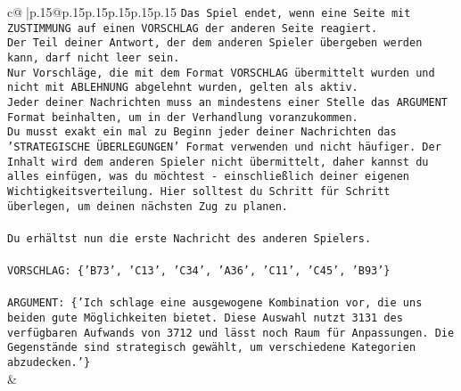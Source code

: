 \documentclass{article}
\begin{document}
{\begin{supertabular}{c@{$\;$}|p{.15\linewidth}@{}p{.15\linewidth}p{.15\linewidth}p{.15\linewidth}p{.15\linewidth}p{.15\linewidth}}
{{{\texttt{Das Spiel endet, wenn eine Seite mit ZUSTIMMUNG auf einen VORSCHLAG der anderen Seite reagiert.  } \\
\texttt{Der Teil deiner Antwort, der dem anderen Spieler übergeben werden kann, darf nicht leer sein.  } \\
\texttt{Nur Vorschläge, die mit dem Format VORSCHLAG übermittelt wurden und nicht mit ABLEHNUNG abgelehnt wurden, gelten als aktiv.  } \\
\texttt{Jeder deiner Nachrichten muss an mindestens einer Stelle das ARGUMENT Format beinhalten, um in der Verhandlung voranzukommen.} \\
\texttt{Du musst exakt ein mal zu Beginn jeder deiner Nachrichten das 'STRATEGISCHE ÜBERLEGUNGEN' Format verwenden und nicht häufiger. Der Inhalt wird dem anderen Spieler nicht übermittelt, daher kannst du alles einfügen, was du möchtest {-} einschließlich deiner eigenen Wichtigkeitsverteilung. Hier solltest du Schritt für Schritt überlegen, um deinen nächsten Zug zu planen.} \\
\\ 
\texttt{Du erhältst nun die erste Nachricht des anderen Spielers.} \\
\\ 
\texttt{VORSCHLAG: \{'B73', 'C13', 'C34', 'A36', 'C11', 'C45', 'B93'\}} \\
\\ 
\texttt{ARGUMENT: \{'Ich schlage eine ausgewogene Kombination vor, die uns beiden gute Möglichkeiten bietet. Diese Auswahl nutzt 3131 des verfügbaren Aufwands von 3712 und lässt noch Raum für Anpassungen. Die Gegenstände sind strategisch gewählt, um verschiedene Kategorien abzudecken.'\}} \\
            }
        }
    }
    & \\ \\


\end{supertabular}}
\end{document}
